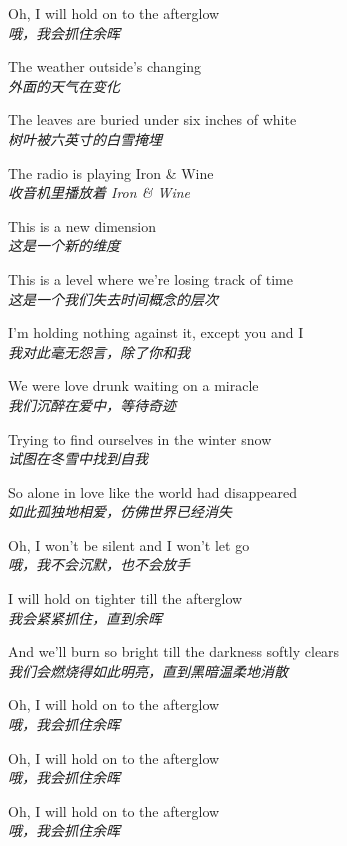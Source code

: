 \begin{spacing}{1.5}
\begin{flushleft}
Oh, I will hold on to the afterglow\\
\textit{哦，我会抓住余晖}\lyricspace

The weather outside's changing\\
\textit{外面的天气在变化}\lyricspace

The leaves are buried under six inches of white\\
\textit{树叶被六英寸的白雪掩埋}\lyricspace

The radio is playing Iron \& Wine\\
\textit{收音机里播放着 Iron \& Wine}\lyricspace

This is a new dimension\\
\textit{这是一个新的维度}\lyricspace

This is a level where we're losing track of time\\
\textit{这是一个我们失去时间概念的层次}\lyricspace

I'm holding nothing against it, except you and I\\
\textit{我对此毫无怨言，除了你和我}\lyricspace

We were love drunk waiting on a miracle\\
\textit{我们沉醉在爱中，等待奇迹}\lyricspace

Trying to find ourselves in the winter snow\\
\textit{试图在冬雪中找到自我}\lyricspace

So alone in love like the world had disappeared\\
\textit{如此孤独地相爱，仿佛世界已经消失}\lyricspace

Oh, I won't be silent and I won't let go\\
\textit{哦，我不会沉默，也不会放手}\lyricspace

I will hold on tighter till the afterglow\\
\textit{我会紧紧抓住，直到余晖}\lyricspace

And we'll burn so bright till the darkness softly clears\\
\textit{我们会燃烧得如此明亮，直到黑暗温柔地消散}\lyricspace

Oh, I will hold on to the afterglow\\
\textit{哦，我会抓住余晖}\lyricspace

Oh, I will hold on to the afterglow\\
\textit{哦，我会抓住余晖}\lyricspace

Oh, I will hold on to the afterglow\\
\textit{哦，我会抓住余晖}\lyricspace
\end{flushleft}
\end{spacing} 
